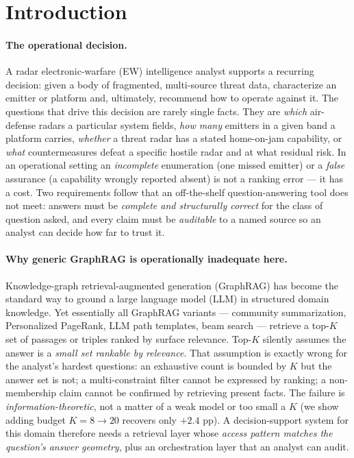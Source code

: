 \documentclass[review]{elsarticle}
\begin{document}
\section{Introduction}
\label{sec:intro}

\paragraph{The operational decision.}
A radar electronic-warfare (EW) intelligence analyst supports a recurring
decision: given a body of fragmented, multi-source threat data, characterize
an emitter or platform and, ultimately, recommend how to operate against it.
The questions that drive this decision are rarely single facts. They are
\emph{which} air-defense radars a particular system fields, \emph{how many}
emitters in a given band a platform carries, \emph{whether} a threat radar
has a stated home-on-jam capability, or \emph{what} countermeasures defeat a
specific hostile radar and at what residual risk. In an operational setting an
\emph{incomplete} enumeration (one missed emitter) or a \emph{false} assurance
(a capability wrongly reported absent) is not a ranking error --- it has a
cost. Two requirements follow that an off-the-shelf question-answering tool
does not meet: answers must be \emph{complete and structurally correct} for
the class of question asked, and every claim must be \emph{auditable} to a
named source so an analyst can decide how far to trust it.

\paragraph{Why generic GraphRAG is operationally inadequate here.}
Knowledge-graph retrieval-augmented generation (GraphRAG)
\citep{edge2024graphrag,gutierrez2024hipporag,peng2025graphrag} has become the
standard way to ground a large language model (LLM) in structured domain
knowledge. Yet essentially all GraphRAG variants --- community summarization,
Personalized PageRank, LLM path templates, beam search
\citep{luo2024rog,sun2024tog,ma2025tog2} --- retrieve a top-$K$ set of
passages or triples ranked by surface relevance. Top-$K$ silently assumes the
answer is a \emph{small set rankable by relevance}. That assumption is exactly
wrong for the analyst's hardest questions: an exhaustive count is bounded by
$K$ but the answer set is not; a multi-constraint filter cannot be expressed
by ranking; a non-membership claim cannot be confirmed by retrieving present
facts. The failure is \emph{information-theoretic}, not a matter of a weak
model or too small a $K$ (we show adding budget $K{=}8\!\to\!20$ recovers only
$+2.4$ pp). A decision-support system for this domain therefore needs a
retrieval layer whose \emph{access pattern matches the question's answer
geometry}, plus an orchestration layer that an analyst can audit.
\end{document}
